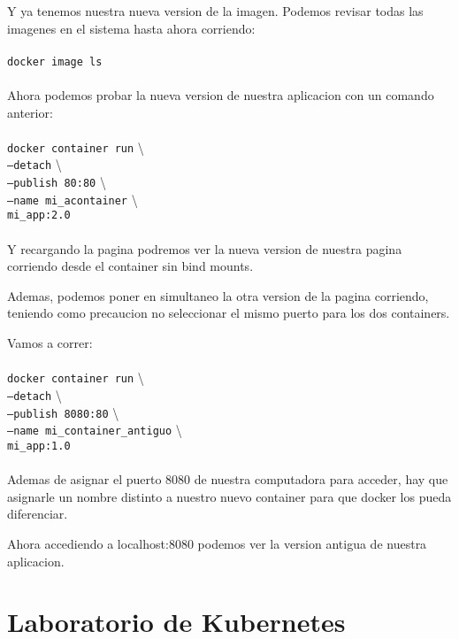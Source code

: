 \documentclass[11pt]{article} %
\begin{document}
Y ya tenemos nuestra nueva version de la imagen. Podemos revisar todas las imagenes en el sistema hasta ahora corriendo: \\ \\
	\texttt{docker image ls} \\ \\

Ahora podemos probar la nueva version de nuestra aplicacion con un comando anterior: \\ \\
	\texttt{docker container run}  \textbackslash \\
	\texttt{--detach}  \textbackslash \\
	\texttt{--publish 80:80} \textbackslash \\
	\texttt{--name mi\_acontainer}  \textbackslash \\
	\texttt{mi\_app:2.0} \\ \\

Y recargando la pagina podremos ver la nueva version de nuestra pagina corriendo desde el container sin bind mounts. 

Ademas, podemos poner en simultaneo la otra version de la pagina corriendo, teniendo como precaucion no seleccionar el mismo puerto para los dos containers.

Vamos a correr: \\ \\
	\texttt{docker container run}  \textbackslash \\
	\texttt{--detach}  \textbackslash \\
	\texttt{--publish 8080:80}  \textbackslash \\
	\texttt{--name mi\_container\_antiguo}  \textbackslash \\
	\texttt{mi\_app:1.0} \\ \\

Ademas de asignar el puerto 8080 de nuestra computadora para acceder, hay que asignarle un nombre distinto a nuestro nuevo container para que docker los pueda diferenciar.

Ahora accediendo a localhost:8080 podemos ver la version antigua de nuestra aplicacion.



\section{Laboratorio de Kubernetes}
\end{document}
